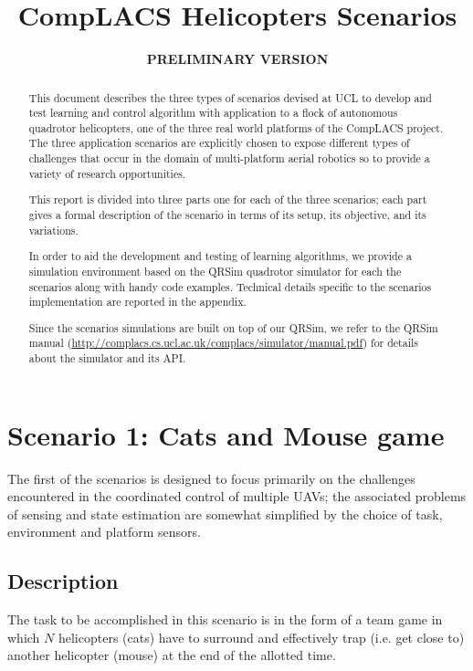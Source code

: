 \documentclass[a4paper,11pt]{report}
\title{{CompLACS} Helicopters Scenarios}
\author{\bf PRELIMINARY VERSION}
\newcommand{\sname}{QRSim\xspace}
\newcommand{\webman}{\url{http://complacs.cs.ucl.ac.uk/complacs/simulator/manual.pdf}\xspace}
\begin{document}
\maketitle



\begin{abstract}
This document describes the three types of scenarios devised at UCL to develop and test learning and control algorithm with application to a flock of autonomous quadrotor helicopters, one of the three real world platforms of the {CompLACS} project.
The three application scenarios are explicitly chosen to expose different types of challenges that occur in the domain of multi-platform aerial robotics so to provide a variety of research opportunities.

This report is divided into three parts one for each of the three scenarios; each part gives a formal description of the scenario in terms of its setup, its objective, and its variations. 

In order to aid the development and testing of learning algorithms, we provide a simulation environment based on the \sname quadrotor simulator for each the scenarios along with handy code examples.
Technical details specific to the scenarios implementation are reported in the appendix. 

Since the scenarios simulations are built on top of our \sname, we refer to the \sname manual (\webman) for details about the simulator and its API.

\end{abstract}

\tableofcontents

\chapter{Scenario 1: Cats and Mouse game}

The first of the scenarios is designed to focus primarily on the challenges encountered in the coordinated control of multiple UAVs; the associated problems of sensing and state estimation are somewhat simplified by the choice of task, environment and platform sensors. 

\section{Description}
The task to be accomplished in this scenario is in the form of a team game in which $N$ helicopters (cats) have to surround and effectively trap (i.e. get close to) another helicopter (mouse) at the end of the allotted time. 
\end{document}

